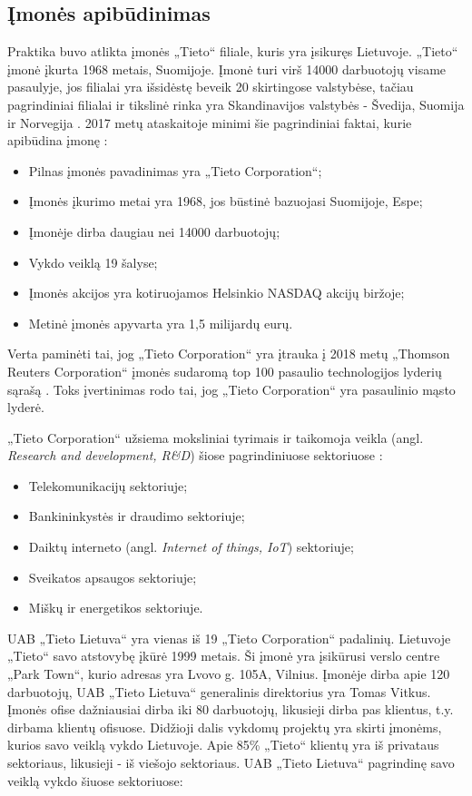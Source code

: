 \documentclass{VUMIFPSbakalaurinis}
\begin{document}
\subsection{Įmonės apibūdinimas}
Praktika buvo atlikta įmonės „Tieto“ filiale, kuris yra įsikuręs Lietuvoje. „Tieto“ įmonė įkurta 1968 metais, Suomijoje. Įmonė turi virš 14000 darbuotojų visame pasaulyje, jos filialai yra išsidėstę beveik 20 skirtingose valstybėse, tačiau pagrindiniai filialai ir tikslinė rinka yra Skandinavijos valstybės - Švedija, Suomija ir Norvegija \cite{TIETO}. 2017 metų ataskaitoje minimi šie pagrindiniai faktai, kurie apibūdina įmonę \cite{TIETO}:
\begin{itemize}
    \item Pilnas įmonės pavadinimas yra „Tieto Corporation“;
    \item Įmonės įkurimo metai yra 1968, jos būstinė bazuojasi Suomijoje, Espe;
    \item Įmonėje dirba daugiau nei 14000 darbuotojų;
    \item Vykdo veiklą 19 šalyse;
    \item Įmonės akcijos yra kotiruojamos Helsinkio NASDAQ akcijų biržoje;
    \item Metinė įmonės apyvarta yra 1,5 milijardų eurų.
\end{itemize}

Verta paminėti tai, jog  „Tieto Corporation“ yra įtrauka į 2018 metų „Thomson Reuters Corporation“ įmonės sudaromą top 100 pasaulio technologijos lyderių sąrašą \cite{List}. Toks įvertinimas rodo tai, jog „Tieto Corporation“ yra pasaulinio mąsto lyderė.

„Tieto Corporation“ užsiema moksliniai tyrimais ir taikomoja veikla (angl. \textit{Research and development, R&D}) šiose pagrindiniuose sektoriuose \cite{TIETO}:
\begin{itemize}
    \item Telekomunikacijų sektoriuje;
    \item Bankininkystės ir draudimo sektoriuje;
    \item Daiktų interneto (angl. \textit{Internet of things, IoT}) sektoriuje;
    \item Sveikatos apsaugos sektoriuje;
    \item Miškų ir energetikos sektoriuje.
\end{itemize}

UAB „Tieto Lietuva“ yra vienas iš 19 „Tieto Corporation“ padalinių. Lietuvoje „Tieto“ savo atstovybę įkūrė 1999 metais. Ši įmonė yra įsikūrusi verslo centre „Park Town“, kurio adresas yra Lvovo g. 105A, Vilnius. Įmonėje dirba apie 120 darbuotojų, UAB „Tieto Lietuva“ generalinis direktorius yra Tomas Vitkus. Įmonės ofise dažniausiai dirba iki 80 darbuotojų, likusieji dirba pas klientus, t.y. dirbama klientų ofisuose. Didžioji dalis vykdomų projektų yra skirti įmonėms, kurios savo veiklą vykdo Lietuvoje. Apie 85\% „Tieto“ klientų yra iš privataus sektoriaus, likusieji - iš viešojo sektoriaus. UAB „Tieto Lietuva“ pagrindinę savo veiklą vykdo šiuose sektoriuose: 
\end{document}
